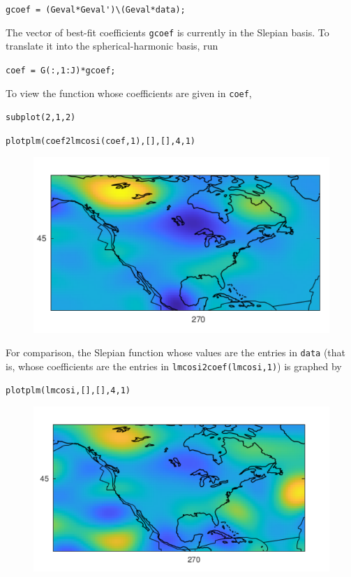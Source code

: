 \documentclass{article}
\begin{document}
\verb!gcoef = (Geval*Geval')\(Geval*data);!


The vector of best-fit coefficients \verb!gcoef! is currently in the Slepian basis. To translate it into the spherical-harmonic basis, run

\verb!coef = G(:,1:J)*gcoef;!

To view the function whose coefficients are given in \verb!coef!,

\verb!subplot(2,1,2)!

\verb!plotplm(coef2lmcosi(coef,1),[],[],4,1)!

\begin{figure}[H]
\includegraphics[scale=.75]{namerica_solvedcoefficients}
\end{figure}

For comparison, the Slepian function whose values are the entries in \verb!data! (that is, whose coefficients are the entries in \verb!lmcosi2coef(lmcosi,1)!) is graphed by

\verb!plotplm(lmcosi,[],[],4,1)!

\begin{figure}[H]
\includegraphics[scale=.75]{namerica_compare}
\end{figure}
 
\end{document}
